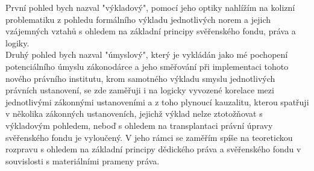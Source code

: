 \documentclass{article}
\begin{document}
První pohled bych nazval "výkladový", pomocí jeho optiky nahlížím na kolizní problematiku z pohledu formálního výkladu jednotlivých norem a jejich vzájemných vztahů s ohledem na základní principy svěřenského fondu, práva a logiky.\\



Druhý pohled bych nazval "úmyslový", který je vykládán jako mé pochopení potenciálního úmyslu zákonodárce a jeho směřování při implementaci tohoto nového právního institutu, krom samotného výkladu smyslu jednotlivých právních ustanovení, se zde zaměřuji i na logicky vyvozené korelace mezi jednotlivými zákonnými ustanoveními a z toho plynoucí kauzalitu, kterou spatřuji v několika zákonných ustanoveních, jejichž výklad nelze ztotožňovat s výkladovým pohledem, neboď s ohledem na transplantaci právní úpravy svěřenského fondu je vyloučený. V jeho rámci se zaměřím spíše na teoretickou rozpravu s ohledem na základní principy dědického práva a svěřenského fondu v souvislosti s materiálními prameny práva.\\



\end{document}
